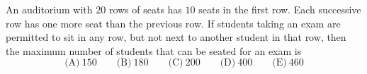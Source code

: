 An auditorium with $20$ rows of seats has $10$ seats in the first row. Each successive row has one more seat than the previous row. If students taking an exam are permitted to sit in any row, but not next to another student in that row, then the maximum number of students that can be seated for an exam is
\[
\text{(A)}\ 150\qquad\text{(B)}\ 180\qquad\text{(C)}\ 200\qquad\text{(D)}\ 400\qquad\text{(E)}\ 460
\]
